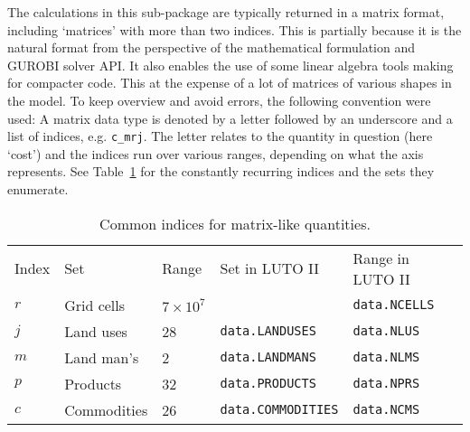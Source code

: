 \documentclass[12pt,a4paper,twoside]{article}
\begin{document}
The calculations in this sub-package are typically returned in a matrix format, including `matrices' with more than two indices. This is partially because it is the natural format from the perspective of the mathematical formulation and GUROBI solver API. It also enables the use of some linear algebra tools making for compacter code. This at the expense of a lot of matrices of various shapes in the model. To keep overview and avoid errors, the following convention were used: A matrix data type is denoted by a letter followed by an underscore and a list of indices, e.g. \texttt{c_mrj}. The letter relates to the quantity in question (here `cost') and the indices run over various ranges, depending on what the axis represents. See Table~\ref{tab:indices} for the constantly recurring indices and the sets they enumerate.
\begin{table}
\centering
\begin{tabular}{lllll}
Index   & Set         & Range                                                & Set in LUTO II                                           & Range in LUTO II                                     \\
$ r $ & Grid cells  & $7 \times 10^7$ &                                                          & \texttt{data.NCELLS}  \\
$ j $ & Land uses   & 28                                                   & \texttt{data.LANDUSES}    & \texttt{data.NLUS}    \\
$ m $ & Land man's   & 2                                                   & \texttt{data.LANDMANS}    & \texttt{data.NLMS}    \\
$ p $ & Products    & 32                                                   & \texttt{data.PRODUCTS}    & \texttt{data.NPRS}    \\
$ c $ & Commodities & 26                                                   & \texttt{data.COMMODITIES} & \texttt{data.NCMS}
\end{tabular}
\caption{Common indices for matrix-like quantities.}
\label{tab:indices}
\end{table}
\end{document}
